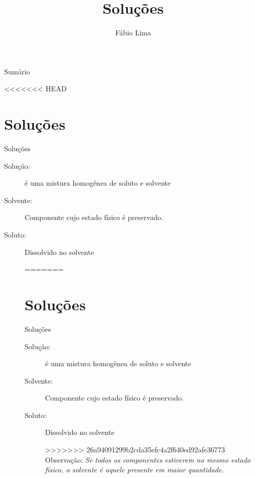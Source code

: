 \documentclass[presentation,professionalfonts,aspectratio=169]{beamer}
\date{}
\author{Fábio Lima}
\date{}
\title{ Soluções}
\begin{document}
\begingroup
  \maketitle
  \endgroup
\begin{frame}{Sumário}
\tableofcontents
\end{frame}


<<<<<<< HEAD

\section{Soluções}
\label{sec:orge930067}

\begin{frame}[label={sec:orgbd3cab3}]{Soluções}
\begin{description}
\item[{Solução:}] é uma mistura homogênea de soluto e solvente
\item[{Solvente:}] Componente cujo estado físico é preservado.
\item[{Soluto:}] Dissolvido no solvente

=======
\section{Soluções}
\label{sec:org5ece32a}

\begin{frame}[label={sec:orgab80f7e}]{Soluções}
\begin{description}
\item[{Solução:}] é uma mistura homogênea de soluto e solvente
\item[{Solvente:}] Componente cujo estado físico é preservado.
\item[{Soluto:}] Dissolvido no solvente

>>>>>>> 26a94091299b2cda35efc4a2f640ed92afe36773
\alert{Observação:} \emph{Se todos os componentes estiverem no mesmo estado físico, o solvente é aquele presente em maior quantidade.}
\end{description}
\end{frame}


\end{description}
\end{frame}
\end{document}
